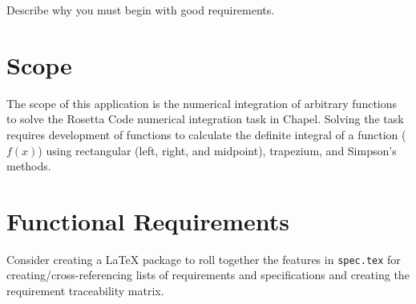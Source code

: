 \label{Requirements}

\begin{TODO}
Describe why you must begin with good requirements.
\end{TODO}

\section{Scope}
\label{Scope}

The scope of this application is the numerical integration of arbitrary functions 
to solve the Rosetta Code numerical integration task\cite{rosetta-code-numerical-integration}
in Chapel. Solving the task requires development of functions to calculate the definite 
integral of a function ($f(x)$) using rectangular (left, right, and midpoint), trapezium, and Simpson's methods.

\section{Functional Requirements}
\label{Functional_Requirements}

\begin{future}
Consider creating a \LaTeX\xspace package to roll together the features in \lstinline{spec.tex}
for creating/cross-referencing lists of requirements and specifications and creating the 
requirement traceability matrix.
\end{future}

